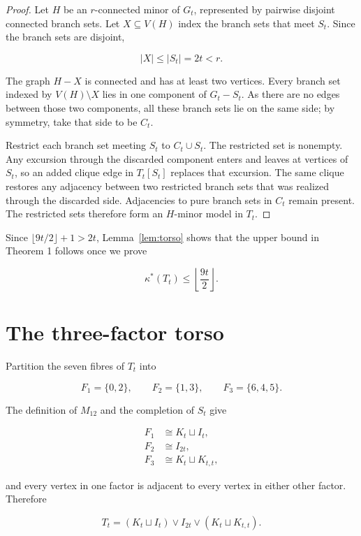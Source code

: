 \documentclass[11pt]{article}
\begin{document}
\begin{proof}

Let $H$ be an $r$-connected minor of $G_t$, represented by pairwise disjoint
connected branch sets. Let $X\subseteq V(H)$ index the branch sets that meet
$S_t$. Since the branch sets are disjoint,

\nopagebreak[4]
\[
|X|\leq|S_t|=2t<r.
\]

The graph $H-X$ is connected and has at least two vertices. Every branch set
indexed by $V(H)\setminus X$ lies in one component of $G_t-S_t$. As there are
no edges between those two components, all these branch sets lie on the same
side; by symmetry, take that side to be $C_t$.

Restrict each branch set meeting $S_t$ to $C_t\cup S_t$. The restricted set is
nonempty. Any excursion through the discarded component enters and leaves at
vertices of $S_t$, so an added clique edge in $T_t[S_t]$ replaces that
excursion. The same clique restores any adjacency between two restricted
branch sets that was realized through the discarded side. Adjacencies to pure
branch sets in $C_t$ remain present. The restricted sets therefore form an
$H$-minor model in $T_t$.
\end{proof}


Since $\lfloor9t/2\rfloor+1>2t$, Lemma~\ref{lem:torso} shows that the upper bound in Theorem
1 follows once we prove

\nopagebreak[4]
\[
\kappa^*(T_t)\leq\left\lfloor\frac{9t}{2}\right\rfloor.     \tag{20}
\]

\section{The three-factor torso}


Partition the seven fibres of $T_t$ into

\nopagebreak[4]
\[
F_1=\{0,2\},
\qquad
F_2=\{1,3\},
\qquad
F_3=\{6,4,5\}.
\]

The definition of $M_{12}$ and the completion of $S_t$ give

\nopagebreak[4]
\[
\begin{aligned}
F_1&\cong K_t\sqcup I_t,\\
F_2&\cong I_{2t},\\
F_3&\cong K_t\sqcup K_{t,t},
\end{aligned}
\]

and every vertex in one factor is adjacent to every vertex in either other
factor. Therefore

\nopagebreak[4]
\[
T_t=(K_t\sqcup I_t)\vee I_{2t}\vee(K_t\sqcup K_{t,t}).      \tag{21}
\]
\end{document}
